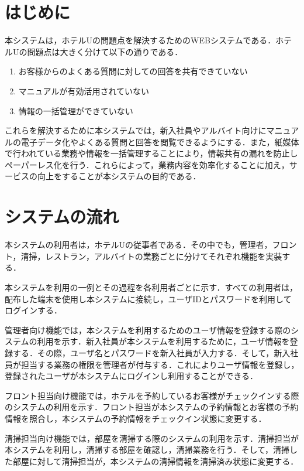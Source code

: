 \documentclass[main]{subfiles}
\begin{document}
\section{はじめに}
本システムは，ホテルUの問題点を解決するためのWEBシステムである．ホテルUの問題点は大きく分けて以下の通りである．

\begin{enumerate}
    \item お客様からのよくある質問に対しての回答を共有できていない

    \item マニュアルが有効活用されていない

    \item 情報の一括管理ができていない
\end{enumerate}

これらを解決するために本システムでは，新入社員やアルバイト向けにマニュアルの電子データ化やよくある質問と回答を閲覧できるようにする．また，紙媒体で行われている業務や情報を一括管理することにより，情報共有の漏れを防止しペーパーレス化を行う．これらによって，業務内容を効率化することに加え，サービスの向上をすることが本システムの目的である．


\section{システムの流れ}
本システムの利用者は，ホテルUの従事者である．その中でも，管理者，フロント，清掃，レストラン，アルバイトの業務ごとに分けてそれぞれ機能を実装する．

本システムを利用の一例とその過程を各利用者ごとに示す．すべての利用者は，配布した端末を使用し本システムに接続し，ユーザIDとパスワードを利用してログインする．

管理者向け機能では，本システムを利用するためのユーザ情報を登録する際のシステムの利用を示す．新入社員が本システムを利用するために，ユーザ情報を登録する．その際，ユーザ名とパスワードを新入社員が入力する．そして，新入社員が担当する業務の権限を管理者が付与する．これによりユーザ情報を登録し，登録されたユーザが本システムにログインし利用することができる．

フロント担当向け機能では，ホテルを予約しているお客様がチェックインする際のシステムの利用を示す．フロント担当が本システムの予約情報とお客様の予約情報を照合し，本システムの予約情報をチェックイン状態に変更する．

清掃担当向け機能では，部屋を清掃する際のシステムの利用を示す．清掃担当が本システムを利用し，清掃する部屋を確認し，清掃業務を行う．そして，清掃した部屋に対して清掃担当が，本システムの清掃情報を清掃済み状態に変更する．
\end{document}

